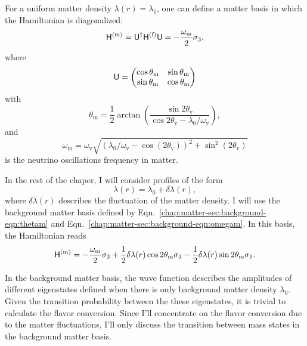 For a uniform matter density $\lambda(r) = \lambda_0$, one can define a matter basis in which the Hamiltonian is diagonalized:
\begin{equation}
\mathsf H^{(\mathrm m)}  = \mathsf U^\dagger \mathsf H^{(\mathrm f)} \mathsf U = -\frac{\omega_\mathrm m}{2} \sigma_3,
\end{equation}
where
\begin{equation}
\mathsf U = \begin{pmatrix}
\cos \theta_\mathrm m & \sin \theta_\mathrm m \\
\sin\theta_\mathrm m & \cos \theta_\mathrm m
\end{pmatrix}
\end{equation}
with
\begin{equation*}
\theta_{\mathrm{m}}= \frac{1}{2} \arctan\left(
\frac{\sin 2\theta_{\mathrm v}}{ \cos 2\theta_{\mathrm v} - \lambda_0/\omega_{\mathrm v} } \right),
\label{chap:matter-sec:background-eqn:thetam}
\end{equation*}
and
\begin{equation}
\omega_{\mathrm{m}} = \omega_{\mathrm{v}} \sqrt{ ( \lambda_0/\omega_{\mathrm{v}} - \cos (2\theta_{\mathrm{v}}) )^2 + \sin^2(2\theta_{\mathrm{v}}) }
\label{chap:matter-sec:background-eqn:omegam}
\end{equation}
is the neutrino oscillations frequency in matter.

In the rest of the chaper, I will consider profiles of the form
\begin{equation}
    \lambda(r) = \lambda_0 + \delta \lambda(r),
    \label{eq-general-matter-profile}
\end{equation}
where $\delta \lambda(r)$ describes the fluctuation of the matter density. I will use the background matter basis defined by Eqn.~\ref{chap:matter-sec:background-eqn:thetam} and Eqn.~\ref{chap:matter-sec:background-eqn:omegam}. In this basis, the Hamiltonian reads
\begin{equation}
    \mathsf H^{(\mathrm{m})} = -\frac{\omega_\mm}{2} \sigma_3 + \frac{1}{2} \delta\lambda(r) \cos 2\theta_{\mathrm m} \sigma_3
     - \frac{1}{2} \delta\lambda(r) \sin 2\theta_{\mathrm m} \sigma_1.
    \label{eq-hamiltonian-bg-matter-basis-general}
\end{equation}

In the background matter basis, the wave function describes the amplitudes of different eigenstates defined when there is only background matter density $\lambda_0$. Given the transition probability between the these eigenstates, it is trivial to calculate the flavor conversion. Since I'll concentrate on the flavor conversion due to the matter fluctuations, I'll only discuss the transition between mass states in the background matter basis.

